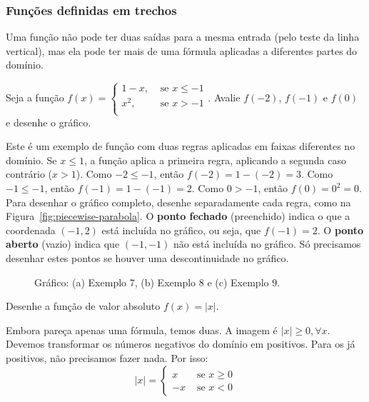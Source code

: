 \subsubsection{Funções definidas em trechos}

Uma função não pode ter duas saídas para a mesma entrada (pelo teste da linha vertical), mas ela pode ter mais de uma fórmula aplicadas a diferentes partes do domínio.

 Seja a função $\displaystyle f(x) = \begin{cases}
1-x, & \text{ se } x \leq -1\\
x^2, & \text{ se } x > -1\\
\end{cases}$.
Avalie $f(-2)$, $f(-1)$ e $f(0)$ e desenhe o gráfico.

\solution
Este é um exemplo de função com duas regras aplicadas em faixas diferentes no domínio. Se $x \leq 1$, a função aplica a primeira regra, aplicando a segunda caso contrário ($x > 1$). Como $-2 \leq -1$, então $f(-2) = 1-(-2) = 3$. Como $-1\leq -1$, então $f(-1)=1-(-1)=2$. Como $0 > -1$, então $f(0) = 0^2 = 0$. Para desenhar o gráfico completo, desenhe separadamente cada regra, como na Figura~\ref{fig:piecewise-parabola}. O \textbf{ponto fechado} (preenchido) indica o que a coordenada $(-1,2)$ está incluída no gráfico, ou seja, que $f(-1) = 2$. O \textbf{ponto aberto} (vazio) indica que $(-1,-1)$ não está incluída no gráfico. Só precisamos desenhar estes pontos se houver uma descontinuidade no gráfico.
\vspace{-0.7cm}\begin{figure}[!ht]
  \centering
  \caption{Gráfico: (a) Exemplo 7, (b) Exemplo 8 e (c) Exemplo 9.}
  \vspace{-0.7cm}
\end{figure}
\exampleEnd
{} Desenhe a função de valor absoluto $f(x) = |x|$.

\solution
Embora pareça apenas uma fórmula, temos duas. A imagem é $|x|\geq 0, \forall x$. Devemos transformar os números negativos do domínio em positivos. Para os já positivos, não precisamos fazer nada. Por isso: $$\displaystyle |x|=\begin{cases}
x &\text{ se } x \geq 0\\
-x & \text{ se } x < 0
\end{cases}$$

